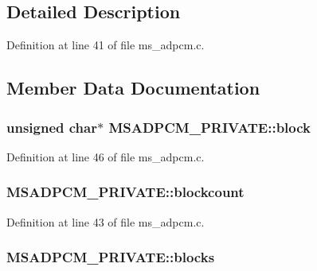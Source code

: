 \subsection{Detailed Description}


Definition at line 41 of file ms\+\_\+adpcm.\+c.



\subsection{Member Data Documentation}
\subsubsection[{\texorpdfstring{block}{block}}]{\setlength{\rightskip}{0pt plus 5cm}unsigned char$\ast$ M\+S\+A\+D\+P\+C\+M\+\_\+\+P\+R\+I\+V\+A\+T\+E\+::block}\hypertarget{struct_m_s_a_d_p_c_m___p_r_i_v_a_t_e_a0a1ccea321756020099f0ba9b445200a}{}\label{struct_m_s_a_d_p_c_m___p_r_i_v_a_t_e_a0a1ccea321756020099f0ba9b445200a}


Definition at line 46 of file ms\+\_\+adpcm.\+c.

\subsubsection[{\texorpdfstring{blockcount}{blockcount}}]{ M\+S\+A\+D\+P\+C\+M\+\_\+\+P\+R\+I\+V\+A\+T\+E\+::blockcount}\hypertarget{struct_m_s_a_d_p_c_m___p_r_i_v_a_t_e_a738fd5659f3bca7d31d2ce9e3c73f94b}{}\label{struct_m_s_a_d_p_c_m___p_r_i_v_a_t_e_a738fd5659f3bca7d31d2ce9e3c73f94b}


Definition at line 43 of file ms\+\_\+adpcm.\+c.

\subsubsection[{\texorpdfstring{blocks}{blocks}}]{ M\+S\+A\+D\+P\+C\+M\+\_\+\+P\+R\+I\+V\+A\+T\+E\+::blocks}\hypertarget{struct_m_s_a_d_p_c_m___p_r_i_v_a_t_e_af26b3a83a31f5b650173d12496b3400a}{}\label{struct_m_s_a_d_p_c_m___p_r_i_v_a_t_e_af26b3a83a31f5b650173d12496b3400a}


